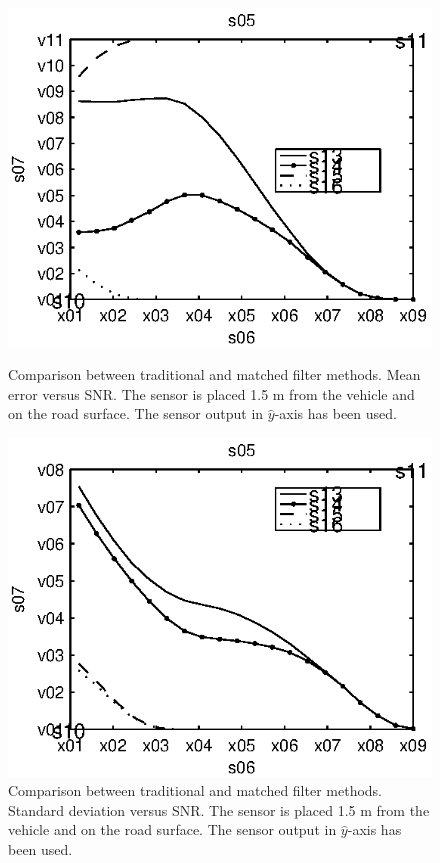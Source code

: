 \begin{subfigures}
\begin{figure}[!tbh]
  \centering
  \begin{minipage}{0.45\linewidth}
  \centering
  
   \includegraphics[width=\linewidth]{images/mean_error_y}
  \caption[Time difference, method comparison. Mean error. $\hat{y}$-axis]{Comparison between traditional and matched filter methods. Mean error versus SNR. The sensor is placed 1.5 m from the vehicle and on the road surface. The sensor output in $\hat{y}$-axis has been used.}
  \label{fig:comp_mean_y}
  \end{minipage}\hfill
  \begin{minipage}{0.45\linewidth}
   \centering
   
   \includegraphics[width=\linewidth]{images/std_error_y}
  \caption[Time difference, method comparison. Error standard deviation. $\hat{y}$-axis]{Comparison between traditional and matched filter methods. Standard deviation versus SNR. The sensor is placed 1.5 m from the vehicle and on the road surface. The sensor output in $\hat{y}$-axis has been used.}
  \label{fig:comp_std_y}
  \end{minipage}
 \end{figure}
\end{subfigures}

